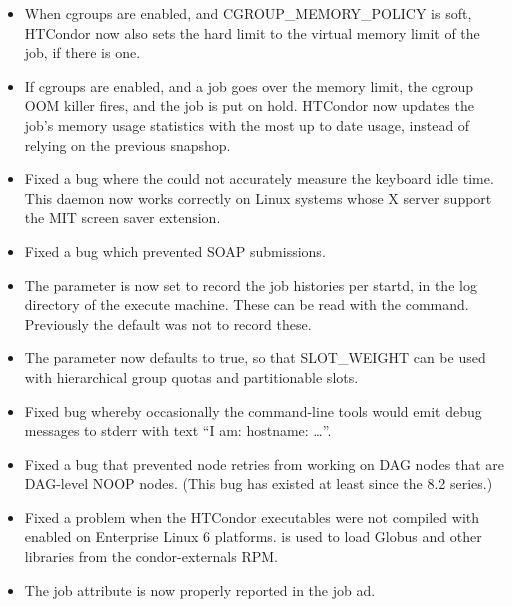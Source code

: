 \begin{itemize}

\item When cgroups are enabled, and CGROUP\_MEMORY\_POLICY is soft, 
HTCondor now also sets the hard limit to the virtual memory limit
of the job, if there is one.

\item If cgroups are enabled, and a job goes over the memory limit, the
cgroup OOM killer fires, and the job is put on hold.  HTCondor now
updates the job's memory usage statistics with the most up to date
usage, instead of relying on the previous snapshop.

\item Fixed a bug where the  could not accurately measure
the keyboard idle time.  This daemon now works correctly on Linux systems
whose X server support the MIT screen saver extension.

\item Fixed a bug which prevented SOAP submissions.

\item The parameter  is now set to record
the job histories per startd, in the log directory of the
execute machine. These can be read with the  command.
Previously the default was not to record these.

\item The parameter  now defaults to
true, so that SLOT\_WEIGHT can be used with hierarchical group quotas
and partitionable slots.

\item Fixed bug whereby occasionally the command-line tools would
	emit debug messages to stderr with text ``I am: hostname: \ldots''.

\item Fixed a bug that prevented node retries from working on DAG
nodes that are DAG-level NOOP nodes.  (This bug has existed at least since
the 8.2 series.)

\item Fixed a problem when the HTCondor executables were not compiled
with  enabled on Enterprise Linux 6 platforms.  is used
to load Globus and other libraries from the condor-externals RPM.

\item The job attribute  is now
properly reported in the job ad.


\end{itemize}
